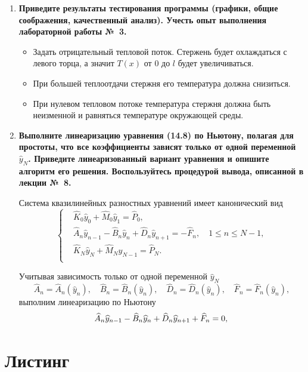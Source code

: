 \documentclass[a4paper,oneside,12pt]{extreport}
\begin{document}
\begin{enumerate}
	\item
	\textbf{
		Приведите результаты тестирования программы (графики, общие соображения, качественный анализ).
		Учесть опыт выполнения лабораторной работы №~3.
	}

	\begin{itemize}
		\item Задать отрицательный тепловой поток.
		Стержень будет охлаждаться с левого торца, а значит $T(x)$ от $0$ до $l$ будет увеличиваться.

		\item При большей теплоотдачи стержня его температура должна снизиться.

		\item При нулевом тепловом потоке температура стержня должна быть неизменной и равняться температуре окружающей среды.
	\end{itemize}


	\item
	\textbf{
		Выполните линеаризацию уравнения (14.8) по Ньютону, полагая для простоты, что все коэффициенты зависят только от одной переменной $\widehat y_N$.
		Приведите линеаризованный вариант уравнения и опишите алгоритм его решения.
		Воспользуйтесь процедурой вывода, описанной в лекции №~8.
	}

	Система квазилинейных разностных уравнений имеет канонический вид
	\begin{equation*}
		\left\{
		\begin{aligned}
			&\widehat K_0\widehat y_0 + \widehat M_0\widehat y_1 = \widehat P_0,\\
			&\widehat A_n\widehat y_{n-1} - \widehat B_n\widehat y_n + \widehat D_n\widehat y_{n+1}=-\widehat F_n, \quad 1\leqslant n\leqslant N-1,\\
			&\widehat K_N\widehat y_N + \widehat M_N\widehat y_{N-1} = \widehat P_N.\\
		\end{aligned}
		\right.
	\end{equation*}

	Учитывая зависимость только от одной переменной $\widehat y_N$
	\begin{equation*}
		\widehat A_n=\widehat A_n(\widehat y_n),\quad
		\widehat B_n=\widehat B_n(\widehat y_n),\quad
		\widehat D_n=\widehat D_n(\widehat y_n),\quad
		\widehat F_n=\widehat F_n(\widehat y_n),
	\end{equation*}
	выполним линеаризацию по Ньютону
	\begin{equation*}
		\widehat A_n\widehat y_{n-1} - \widehat B_n\widehat y_n + \widehat D_n\widehat y_{n+1} + \widehat F_n = 0,\\
	\end{equation*}
\end{enumerate}

\section*{Листинг}




\end{document}

